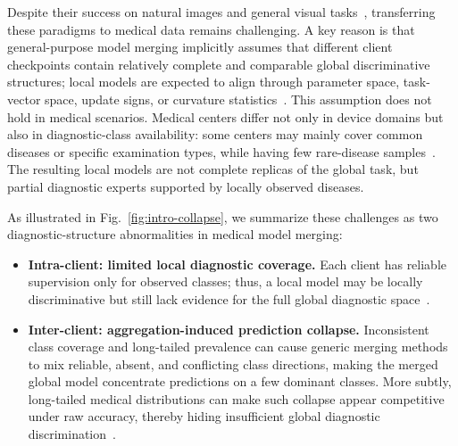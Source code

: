 \documentclass[letterpaper]{article} %
\begin{document}
Despite their success on natural images and general visual tasks~\cite{izmailov2018averaging,pmlr-v162-wortsman22a,ilharco2023editingmodelstaskarithmetic,entezari2022role,ainsworth2023gitrebasinmergingmodels}, transferring these paradigms to medical data remains challenging. A key reason is that general-purpose model merging implicitly assumes that different client checkpoints contain relatively complete and comparable global discriminative structures; local models are expected to align through parameter space, task-vector space, update signs, or curvature statistics~\cite{yadav2023tiesmergingresolvinginterferencemerging,yu2024languagemodelssupermario,matena2022mergingmodelsfisherweightedaveraging,jin2025datalessknowledgefusionmerging}. This assumption does not hold in medical scenarios. Medical centers differ not only in device domains but also in diagnostic-class availability: some centers may mainly cover common diseases or specific examination types, while having few rare-disease samples~\cite{9557808,10.1371/journal.pmed.1002683,li2021fedbn}. The resulting local models are not complete replicas of the global task, but partial diagnostic experts supported by locally observed diseases.

As illustrated in Fig.~\ref{fig:intro-collapse}, we summarize these challenges as two diagnostic-structure abnormalities in medical model merging:
\begin{itemize}
    \item \textbf{Intra-client: limited local diagnostic coverage.} Each client has reliable supervision only for observed classes; thus, a local model may be locally discriminative but still lack evidence for the full global diagnostic space~\cite{9557808,li2021fedbn}.
    \item \textbf{Inter-client: aggregation-induced prediction collapse.} Inconsistent class coverage and long-tailed prevalence can cause generic merging methods to mix reliable, absent, and conflicting class directions, making the merged global model concentrate predictions on a few dominant classes. More subtly, long-tailed medical distributions can make such collapse appear competitive under raw accuracy, thereby hiding insufficient global diagnostic discrimination~\cite{BUDA2018249,5597285}.
\end{itemize}
\end{document}
